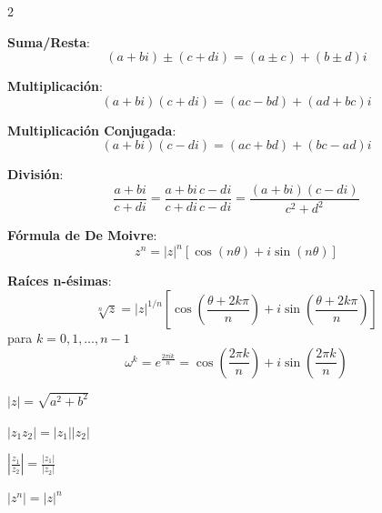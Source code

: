 \begin{multicols}{2}
              \begin{itemform}[leftmargin=*]
                \item \textbf{Suma/Resta}:
                  $$ (a+bi) \pm (c+di) = (a \pm c) + (b \pm d)i $$

                \item \textbf{Multiplicación}:
                  $$ (a+bi)(c+di) = (ac-bd) + (ad+bc)i $$
                \item \textbf{Multiplicación Conjugada}:
                  $$ (a+bi)(c-di) = (ac+bd) + (bc-ad)i $$

                \item \textbf{División}:
                  $$ \frac{a+bi}{c+di} =\frac{a+bi}{c+di} \dfrac{c-di}{c-di} = \frac{(a+bi)(c-di)}{c^2+d^2} $$
              \end{itemform}

              \begin{itemform}[leftmargin=*]
                \item \textbf{Fórmula de De Moivre}:
                  $$ z^n = |z|^n \left[\cos(n\theta) + i\sin(n\theta)\right] $$

                \item \textbf{Raíces n-ésimas}:
                  $$ \sqrt[n]{z} = |z|^{1/n} \left[\cos\left(\frac{\theta + 2k\pi}{n}\right) + i\sin\left(\frac{\theta + 2k\pi}{n}\right)\right] $$
                  para $k = 0,1,\dots,n-1$
                  \[
\omega^k = e^{\frac{2\pi i k}{n}} = \cos\left(\frac{2\pi k}{n}\right) + i\sin\!\left(\frac{2\pi k}{n}\right)
\]

              \end{itemform}

              \begin{itemform}[leftmargin=*]
                \item $|z| = \sqrt{a^2 + b^2}$
                \item $|z_1 z_2| = |z_1||z_2|$
                \item $\left|\frac{z_1}{z_2}\right| = \frac{|z_1|}{|z_2|}$
                \item $|z^n| = |z|^n$
              \end{itemform}

            \end{multicols}
            \newpage

